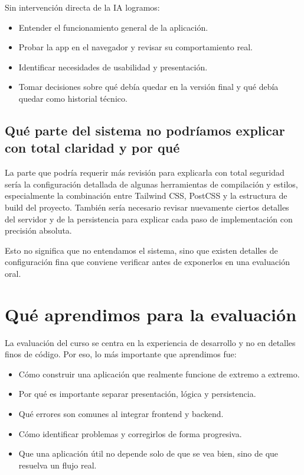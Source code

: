 \documentclass[12pt,a4paper]{article}
\begin{document}
Sin intervención directa de la IA logramos:

\begin{itemize}[leftmargin=1.2cm]
    \item Entender el funcionamiento general de la aplicación.
    \item Probar la app en el navegador y revisar su comportamiento real.
    \item Identificar necesidades de usabilidad y presentación.
    \item Tomar decisiones sobre qué debía quedar en la versión final y qué debía quedar como historial técnico.
\end{itemize}

\subsection{Qué parte del sistema no podríamos explicar con total claridad y por qué}

La parte que podría requerir más revisión para explicarla con total seguridad sería la configuración detallada de algunas herramientas de compilación y estilos, especialmente la combinación entre Tailwind CSS, PostCSS y la estructura de build del proyecto. También sería necesario revisar nuevamente ciertos detalles del servidor y de la persistencia para explicar cada paso de implementación con precisión absoluta.

Esto no significa que no entendamos el sistema, sino que existen detalles de configuración fina que conviene verificar antes de exponerlos en una evaluación oral.

\section{Qué aprendimos para la evaluación}

La evaluación del curso se centra en la experiencia de desarrollo y no en detalles finos de código. Por eso, lo más importante que aprendimos fue:

\begin{itemize}[leftmargin=1.2cm]
    \item Cómo construir una aplicación que realmente funcione de extremo a extremo.
    \item Por qué es importante separar presentación, lógica y persistencia.
    \item Qué errores son comunes al integrar frontend y backend.
    \item Cómo identificar problemas y corregirlos de forma progresiva.
    \item Que una aplicación útil no depende solo de que se vea bien, sino de que resuelva un flujo real.
\end{itemize}
\end{document}
